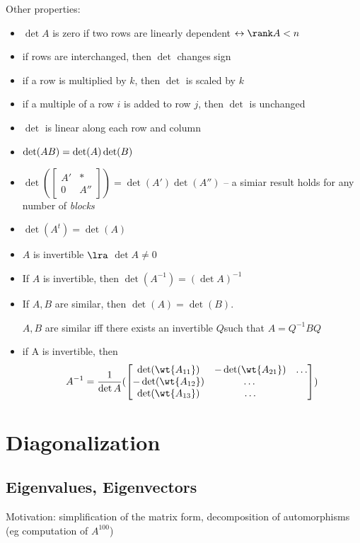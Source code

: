 \documentclass[11pt]{scrartcl}
\begin{document}
Other properties:
\begin{itemize}
\item \(\det A\) is zero if two rows are linearly dependent \(\leftrightarrow \rank A < n\)
\item if rows are interchanged, then \(\det\) changes sign
\item if a row is multiplied by \(k\), then \(\det\) is scaled by \(k\)
\item if a multiple of a row \(i\) is added to row \(j\), then \(\det\) is unchanged
\item \(\det\) is linear along each row and column
\item \(\det(AB) = \det(A) \* \det(B)\)
\item \(\det(\begin{bmatrix}
    A' & *\\
    0 & A''
  \end{bmatrix}) = \det(A') \det (A'')\) -- a simiar result holds for any number of \emph{blocks}
\item \(\det(A^{t}) = \det(A)\)
\item \(A\) is invertible \(\lra\) \(\det A \neq 0\)
\item If \(A\) is invertible, then \(\det(A^{-1}) = (\det A)^{-1}\)
\item If \(A, B\) are similar, then \(\det(A) = \det(B)\).
  \begin{note}
    \(A, B\) are similar iff there exists an invertible \(Q\)such that \(A = Q^{-1} B Q\)
  \end{note}
\item if A is invertible, then
  \[
    A^{-1} = \frac{1}{\det A} (
    \begin{bmatrix}
      \det(\wt{A_{11}}) & -\det(\wt{A_{21}}) & \dots\\
      - \det(\wt{A_{12}}) & \dots & \\
      \det(\wt{A_{13}}) & \dots
    \end{bmatrix})
  \]
\end{itemize}
\section{Diagonalization}
\label{sec:diag}
\subsection{Eigenvalues, Eigenvectors}
\label{subsec:eig}

Motivation: simplification of the matrix form, decomposition of automorphisms (eg computation of \(A^{100}\))
\end{document}

